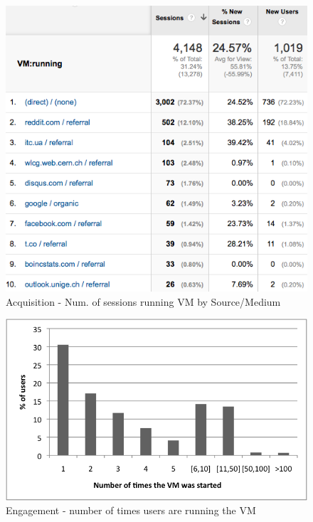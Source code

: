 \documentclass{article}
\begin{document}
\begin{figure}[t]
  \begin{center}
		\includegraphics[width=\columnwidth]{imgs/sourceMediumVMRunning.png}
  \end{center}
\caption{Acquisition - Num. of sessions running VM by Source/Medium}
\label{img:AcquisitionRunningVM}
\end{figure}      
      
      


\begin{figure}[t]
  \begin{center}
		\includegraphics[width=\columnwidth]{imgs/Engagement.png}
  \end{center}
\caption{Engagement - number of times users are running the VM}
\label{img:EngagementVMrunning}
\end{figure}
\end{document}
